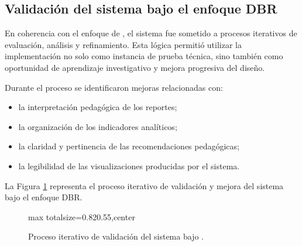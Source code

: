 \begin{refsection}
\section{Validación del sistema bajo el enfoque DBR}

En coherencia con el enfoque de \DBR, el sistema fue sometido a procesos iterativos de evaluación, análisis y refinamiento. Esta lógica permitió utilizar la implementación no solo como instancia de prueba técnica, sino también como oportunidad de aprendizaje investigativo y mejora progresiva del diseño.

Durante el proceso se identificaron mejoras relacionadas con:

\begin{itemize}
\item la interpretación pedagógica de los reportes;
\item la organización de los indicadores analíticos;
\item la claridad y pertinencia de las recomendaciones pedagógicas;
\item la legibilidad de las visualizaciones producidas por el sistema.
\end{itemize}

La Figura \ref{fig:ciclo-validacion} representa el proceso iterativo de validación y mejora del sistema bajo el enfoque DBR.

\begin{figure}[htbp]
\centering
\begin{adjustbox}{max totalsize={0.82\textwidth}{0.55\textheight},center}
\end{adjustbox}
\caption{Proceso iterativo de validación del sistema bajo \DBR.}
\label{fig:ciclo-validacion}
\end{figure}


\end{refsection}
